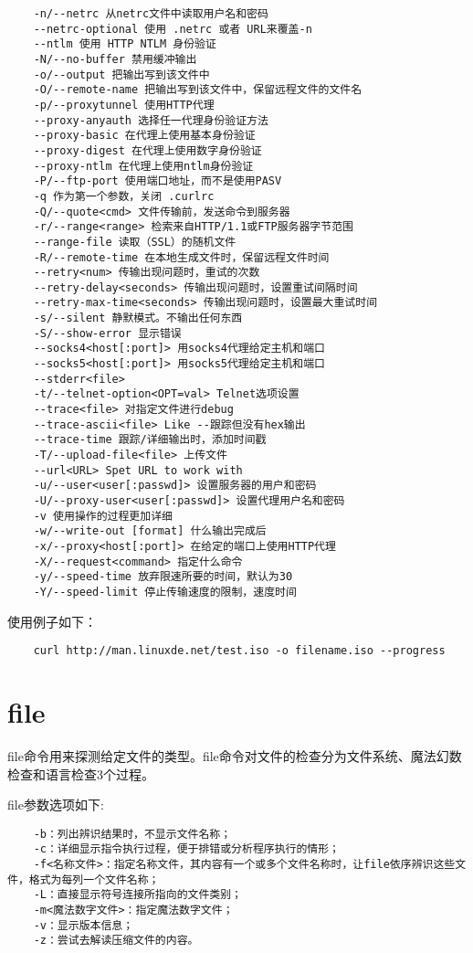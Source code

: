 \documentclass[a4paper,left=2.5cm,right=2.5cm,11pt]{article}
\begin{document}
\begin{lstlisting}
	-n/--netrc 从netrc文件中读取用户名和密码 
	--netrc-optional 使用 .netrc 或者 URL来覆盖-n 
	--ntlm 使用 HTTP NTLM 身份验证 
	-N/--no-buffer 禁用缓冲输出 
	-o/--output 把输出写到该文件中 
	-O/--remote-name 把输出写到该文件中，保留远程文件的文件名 
	-p/--proxytunnel 使用HTTP代理 
	--proxy-anyauth 选择任一代理身份验证方法 
	--proxy-basic 在代理上使用基本身份验证 
	--proxy-digest 在代理上使用数字身份验证 
	--proxy-ntlm 在代理上使用ntlm身份验证 
	-P/--ftp-port 使用端口地址，而不是使用PASV 
	-q 作为第一个参数，关闭 .curlrc 
	-Q/--quote<cmd> 文件传输前，发送命令到服务器 
	-r/--range<range> 检索来自HTTP/1.1或FTP服务器字节范围 
	--range-file 读取（SSL）的随机文件 
	-R/--remote-time 在本地生成文件时，保留远程文件时间 
	--retry<num> 传输出现问题时，重试的次数 
	--retry-delay<seconds> 传输出现问题时，设置重试间隔时间 
	--retry-max-time<seconds> 传输出现问题时，设置最大重试时间 
	-s/--silent 静默模式。不输出任何东西 
	-S/--show-error 显示错误 
	--socks4<host[:port]> 用socks4代理给定主机和端口 
	--socks5<host[:port]> 用socks5代理给定主机和端口 
	--stderr<file> 
	-t/--telnet-option<OPT=val> Telnet选项设置 
	--trace<file> 对指定文件进行debug 
	--trace-ascii<file> Like --跟踪但没有hex输出 
	--trace-time 跟踪/详细输出时，添加时间戳 
	-T/--upload-file<file> 上传文件 
	--url<URL> Spet URL to work with 
	-u/--user<user[:passwd]> 设置服务器的用户和密码 
	-U/--proxy-user<user[:passwd]> 设置代理用户名和密码 
	-v 使用操作的过程更加详细
	-w/--write-out [format] 什么输出完成后 
	-x/--proxy<host[:port]> 在给定的端口上使用HTTP代理 
	-X/--request<command> 指定什么命令 
	-y/--speed-time 放弃限速所要的时间，默认为30 
	-Y/--speed-limit 停止传输速度的限制，速度时间
	\end{lstlisting}

	使用例子如下：
	\begin{lstlisting}
	curl http://man.linuxde.net/test.iso -o filename.iso --progress
	\end{lstlisting}

\section{file}
	file命令用来探测给定文件的类型。file命令对文件的检查分为文件系统、魔法幻数检查和语言检查3个过程。\par

	file参数选项如下:
	\begin{lstlisting}
	-b：列出辨识结果时，不显示文件名称； 
	-c：详细显示指令执行过程，便于排错或分析程序执行的情形； 
	-f<名称文件>：指定名称文件，其内容有一个或多个文件名称时，让file依序辨识这些文件，格式为每列一个文件名称； 
	-L：直接显示符号连接所指向的文件类别； 
	-m<魔法数字文件>：指定魔法数字文件； 
	-v：显示版本信息； 
	-z：尝试去解读压缩文件的内容。
	\end{lstlisting}
\end{document}
